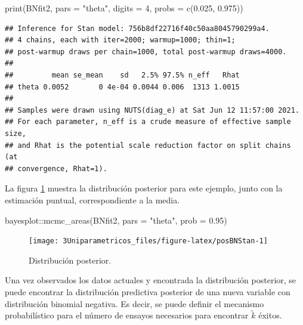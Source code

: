 \documentclass[
  10pt,
  spanish,
]{book}
\newenvironment{Shaded}{\begin{snugshade}}{\end{snugshade}}
\newcommand{\AttributeTok}[1]{\textcolor[rgb]{0.77,0.63,0.00}{#1}}
\newcommand{\DecValTok}[1]{\textcolor[rgb]{0.00,0.00,0.81}{#1}}
\newcommand{\FloatTok}[1]{\textcolor[rgb]{0.00,0.00,0.81}{#1}}
\newcommand{\FunctionTok}[1]{\textcolor[rgb]{0.00,0.00,0.00}{#1}}
\newcommand{\NormalTok}[1]{#1}
\newcommand{\SpecialCharTok}[1]{\textcolor[rgb]{0.00,0.00,0.00}{#1}}
\newcommand{\StringTok}[1]{\textcolor[rgb]{0.31,0.60,0.02}{#1}}
\theoremstyle{definition}
\theoremstyle{definition}
\theoremstyle{definition}
\theoremstyle{definition}
\theoremstyle{remark}
\begin{document}
\begin{Shaded}
\begin{Highlighting}[]
\FunctionTok{print}\NormalTok{(BNfit2, }\AttributeTok{pars =} \StringTok{"theta"}\NormalTok{, }
      \AttributeTok{digits =} \DecValTok{4}\NormalTok{, }\AttributeTok{probs =} \FunctionTok{c}\NormalTok{(}\FloatTok{0.025}\NormalTok{, }\FloatTok{0.975}\NormalTok{))}
\end{Highlighting}
\end{Shaded}

\begin{verbatim}
## Inference for Stan model: 756b8df22716f40c50aa8045790299a4.
## 4 chains, each with iter=2000; warmup=1000; thin=1; 
## post-warmup draws per chain=1000, total post-warmup draws=4000.
## 
##         mean se_mean    sd   2.5% 97.5% n_eff   Rhat
## theta 0.0052       0 4e-04 0.0044 0.006  1313 1.0015
## 
## Samples were drawn using NUTS(diag_e) at Sat Jun 12 11:57:00 2021.
## For each parameter, n_eff is a crude measure of effective sample size,
## and Rhat is the potential scale reduction factor on split chains (at 
## convergence, Rhat=1).
\end{verbatim}

La figura \ref{fig:posBNStan} muestra la distribución posterior para este ejemplo, junto con la estimación puntual, correspondiente a la media.

\begin{Shaded}
\begin{Highlighting}[]
\NormalTok{bayesplot}\SpecialCharTok{::}\FunctionTok{mcmc\_areas}\NormalTok{(BNfit2, }\AttributeTok{pars =} \StringTok{"theta"}\NormalTok{, }
                      \AttributeTok{prob =} \FloatTok{0.95}\NormalTok{)}
\end{Highlighting}
\end{Shaded}

\begin{figure}

{\centering \texttt{[image: 3Uniparametricos\_files/figure-latex/posBNStan-1]} 

}

\caption{Distribución posterior.}\label{fig:posBNStan}
\end{figure}

Una vez observados los datos actuales y encontrada la distribución posterior, se puede encontrar la distribución predictiva posterior de una nueva variable con distribución binomial negativa. Es decir, se puede definir el mecanismo probabilístico para el número de ensayos necesarios para encontrar \(\tilde{k}\) éxitos.
\end{document}
